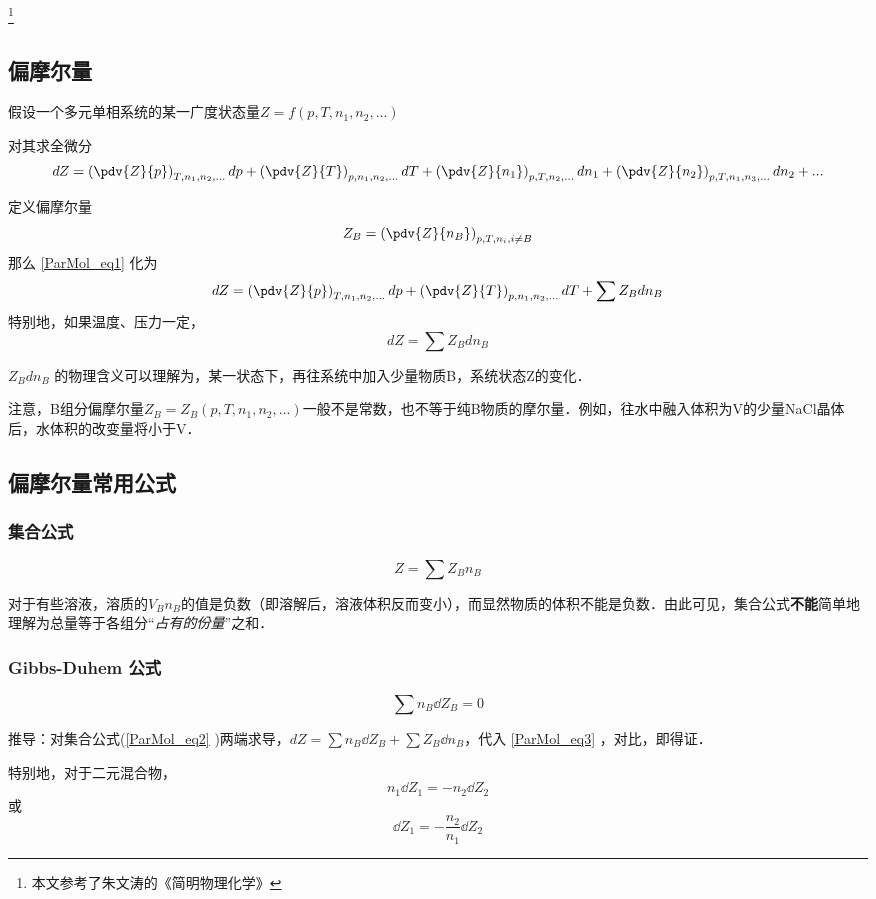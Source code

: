\footnote{本文参考了朱文涛的《简明物理化学》}

\subsection{偏摩尔量}
假设一个多元单相系统的某一广度状态量$Z=f(p,T,n_1,n_2,...)$

对其求全微分
\begin{equation}\label{ParMol_eq1}
dZ = \left(\pdv{Z}{p}\right)_{T,n_1,n_2,...}dp + \left(\pdv{Z}{T}\right)_{p,n_1,n_2,...}dT+\left(\pdv{Z}{n_1}\right)_{p,T,n_2,...}dn_1+\left(\pdv{Z}{n_2}\right)_{p,T,n_1,n_3,...}dn_2+...
\end{equation}

定义偏摩尔量
\begin{equation}
{Z_B} = \left(\pdv{Z}{n_B}\right)_{p,T,n_i, i \neq B} 
\end{equation}
那么 \autoref{ParMol_eq1} 化为 
\begin{equation}
dZ = \left(\pdv{Z}{p}\right)_{T,n_1,n_2,...}dp + \left(\pdv{Z}{T}\right)_{p,n_1,n_2,...}dT+\sum {Z_B} dn_B
\end{equation}
特别地，如果温度、压力一定，
\begin{equation}\label{ParMol_eq3}
dZ = \sum {Z_B} dn_B
\end{equation}

${Z_B} d n_B$ 的物理含义可以理解为，某一状态下，再往系统中加入少量物质B，系统状态Z的变化．

注意，B组分偏摩尔量${Z_B}={Z_B}(p,T,n_1,n_2,...)$一般不是常数，也不等于纯B物质的摩尔量．例如，往水中融入体积为V的少量NaCl晶体后，水体积的改变量将小于V．

\subsection{偏摩尔量常用公式}
\subsubsection{集合公式}
\begin{equation}\label{ParMol_eq2}
Z=\sum {Z_B}  n_B
\end{equation}

对于有些溶液，溶质的${V_B}n_B$的值是负数（即溶解后，溶液体积反而变小），而显然物质的体积不能是负数．由此可见，集合公式\textbf{不能}简单地理解为总量等于各组分“\textsl{占有的份量}”之和．

\subsubsection{Gibbs-Duhem 公式}
\begin{equation}
\sum n_B \dd Z_B = 0
\end{equation}

推导：对集合公式(\autoref{ParMol_eq2} )两端求导，$dZ=\sum n_B \dd Z_B + \sum {Z_B}  \dd n_B$，代入 \autoref{ParMol_eq3} ，对比，即得证．

特别地，对于二元混合物，
\begin{equation}
n_1 \dd {Z_1} = - n_2 \dd {Z_2}
\end{equation}
或
\begin{equation}
\dd {Z_1} = -\frac{n_2}{n_1} \dd {Z_2}
\end{equation}

